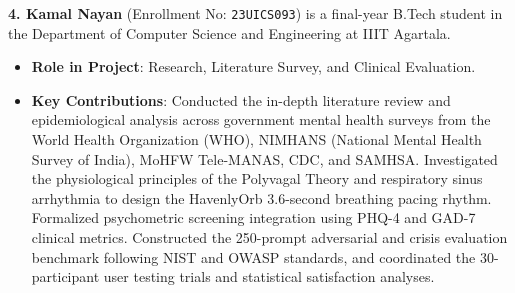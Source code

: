 \documentclass[USenglish,a4paper,12pt]{nitathesis}
\begin{document}
\vspace{0.3cm}
\textbf{4. Kamal Nayan} (Enrollment No: \texttt{23UICS093}) is a final-year B.Tech student in the Department of Computer Science and Engineering at IIIT Agartala.
\begin{itemize}
    \item \textbf{Role in Project}: Research, Literature Survey, and Clinical Evaluation.
    \item \textbf{Key Contributions}: Conducted the in-depth literature review and epidemiological analysis across government mental health surveys from the World Health Organization (WHO), NIMHANS (National Mental Health Survey of India), MoHFW Tele-MANAS, CDC, and SAMHSA. Investigated the physiological principles of the Polyvagal Theory and respiratory sinus arrhythmia to design the HavenlyOrb 3.6-second breathing pacing rhythm. Formalized psychometric screening integration using PHQ-4 and GAD-7 clinical metrics. Constructed the 250-prompt adversarial and crisis evaluation benchmark following NIST and OWASP standards, and coordinated the 30-participant user testing trials and statistical satisfaction analyses.
\end{itemize}
\end{document}
